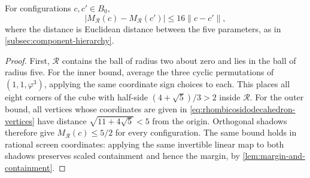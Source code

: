 \begin{lemma}\label{lem:lipschitz-bound-for-the-margin}
  For configurations $c,c'\in B_0$,
  \begin{equation}\label{eq:margin-lipschitz-bound}
    |M_{\mathcal R}(c)-M_{\mathcal R}(c')|
       \le16\lVert c-c'\rVert,
  \end{equation}
  where the distance is Euclidean distance between the five parameters,
  as in \cref{subsec:component-hierarchy}.
\end{lemma}
\begin{proof}
  First, $\mathcal R$ contains the ball of radius two about zero and lies
  in the ball of radius five. For the inner bound, average the three cyclic
  permutations of $(1,1,\varphi^3)$, applying the same coordinate sign
  choices to each. This places all eight corners of the cube with half-side
  $(4+\sqrt5)/3>2$ inside $\mathcal R$. For the outer bound, all vertices
  whose coordinates are given in \cref{eq:rhombicosidodecahedron-vertices}
  have distance $\sqrt{11+4\sqrt5}<5$ from the origin. Orthogonal shadows
  therefore give $M_{\mathcal R}(c)\le5/2$ for every configuration.
  The same bound holds in rational screen coordinates: applying the same
  invertible linear map to both shadows preserves scaled containment and
  hence the margin, by \cref{lem:margin-and-containment}.


\end{proof}
